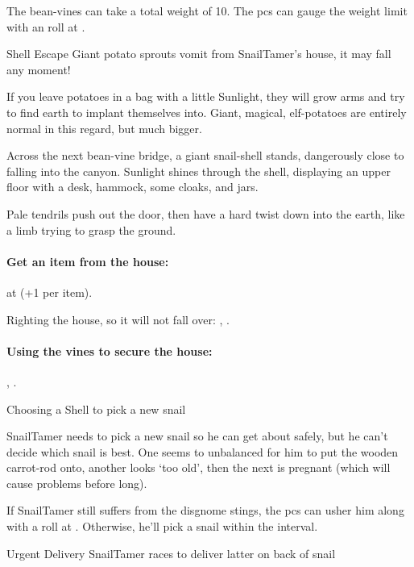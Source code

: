 The bean-vines can take a total \gls{weight} of 10.
The \glspl{pc} can gauge the weight limit with an  roll at \tn[8].

{Shell Escape}%
{Giant potato sprouts vomit from \gls{SnailTamer}'s house, it may fall any moment!}%

If you leave potatoes in a bag with a little Sunlight, they will grow arms and try to find earth to implant themselves into.
Giant, magical, elf-potatoes are entirely normal in this regard, but much bigger.

\begin{speechtext}
  Across the next bean-vine bridge, a giant snail-shell stands, dangerously close to falling into the canyon.
  Sunlight shines through the shell, displaying an upper floor with a desk, hammock, some cloaks, and jars.

  Pale tendrils push out the door, then have a hard twist down into the earth, like a limb trying to grasp the ground.
\end{speechtext}

\paragraph{Get an item from the house:}
 at \tn[12] (+1 per item).

Righting the house, so it will not fall over:
, \tn[12].

\paragraph{Using the vines to secure the house:}
, \tn[10].


{Choosing a Shell}%
{ to pick a new snail}%

\Gls{SnailTamer} needs to pick a new snail so he can get about safely, but he can't decide which snail is best.
One seems to unbalanced for him to put the wooden carrot-rod onto, another looks `too old', then the next is pregnant (which will cause problems before long).

If \gls{SnailTamer} still suffers from the \gls{disgnome} stings,
the \glspl{pc} can usher him along with a  roll at \tn[10].
Otherwise, he'll pick a snail within the \gls{interval}.

{Urgent Delivery}%
{\gls{SnailTamer} races to deliver latter on back of snail}%


